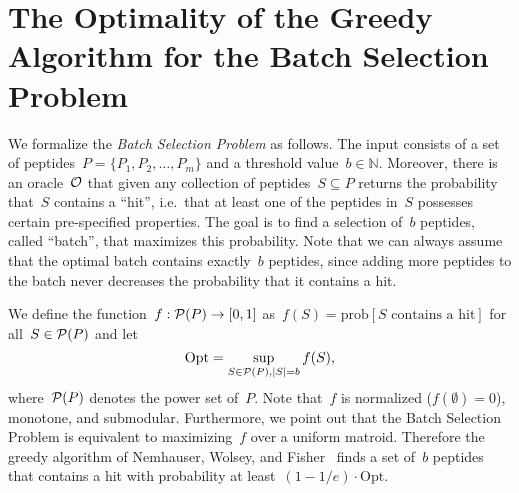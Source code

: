 \section{The Optimality of the Greedy Algorithm for the Batch Selection Problem}
\label{section_optimality_greedy}
%
We formalize the \emph{Batch Selection Problem} as follows. The input consists of a set of peptides~$P = \{P_1, P_2,\ldots,P_m\}$ and a threshold value~$b \in \mathbb{N}$. Moreover, there is an oracle~$\cal O$ that given any collection of peptides~$S \subseteq P$ returns the probability that~$S$ contains a ``hit'', i.e.\ that at least one of the peptides in~$S$ possesses certain pre-specified properties.
%
The goal is to find a selection of~$b$ peptides, called ``batch'', that maximizes this probability. Note that we can always assume that the optimal batch contains exactly~$b$ peptides, since adding more peptides to the batch never decreases the probability that it contains a hit.

We define the function~$f: {\cal P}(P) \to [0,1]$ as~$f(S) = \mathrm{prob}[\text{$S$ contains a hit}]$ for all~$S \in {\cal P}(P)$ and let~$$\mathrm{Opt} = \sup_{S \in {\cal P}(P), |S| = b} f(S),$$ where~${\cal P}(P)$ denotes the power set of~$P$. Note that~$f$ is normalized ($f(\emptyset) = 0$), monotone, and submodular. 
%
Furthermore, we point out that the Batch Selection Problem is equivalent to maximizing~$f$ over a uniform matroid.
%
Therefore the greedy algorithm of Nemhauser, Wolsey, and Fisher~\cite{nwf78} finds a set of~$b$ peptides that contains a hit with probability at least~$(1 - 1/e) \cdot \mathrm{Opt}$.

